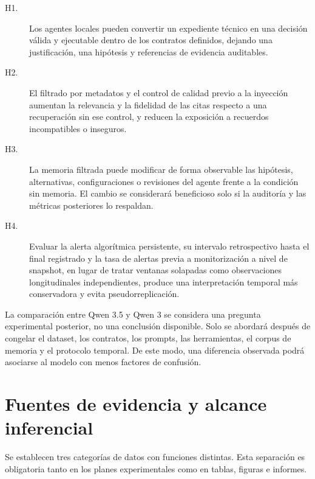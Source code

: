 \begin{description}
  \item[H1.] Los agentes locales pueden convertir un expediente técnico en una
        decisión válida y ejecutable dentro de los contratos definidos, dejando
        una justificación, una hipótesis y referencias de evidencia auditables.
  \item[H2.] El filtrado por metadatos y el control de calidad previo a la
        inyección aumentan la relevancia y la fidelidad de las citas respecto a
        una recuperación sin ese control, y reducen la exposición a recuerdos
        incompatibles o inseguros.
  \item[H3.] La memoria filtrada puede modificar de forma observable las
        hipótesis, alternativas, configuraciones o revisiones del agente frente
        a la condición sin memoria. El cambio se considerará beneficioso solo
        si la auditoría y las métricas posteriores lo respaldan.
  \item[H4.] Evaluar la alerta algorítmica persistente, su intervalo
        retrospectivo hasta el final registrado y la tasa de alertas previa a
        monitorización a nivel de snapshot, en lugar de tratar ventanas
        solapadas como observaciones longitudinales independientes, produce una
        interpretación temporal más conservadora y evita pseudorreplicación.
\end{description}

La comparación entre Qwen 3.5 y Qwen 3 se considera una pregunta experimental
posterior, no una conclusión disponible. Solo se abordará después de congelar el
dataset, los contratos, los prompts, las herramientas, el corpus de memoria y el
protocolo temporal. De este modo, una diferencia observada podrá asociarse al
modelo con menos factores de confusión.

\section{Fuentes de evidencia y alcance inferencial}

Se establecen tres categorías de datos con funciones distintas. Esta separación
es obligatoria tanto en los planes experimentales como en tablas, figuras e
informes.

